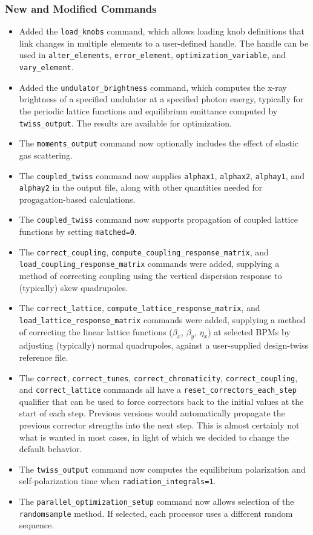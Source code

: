 \documentclass[11pt]{article}
\begin{document}
\subsubsection{New and Modified Commands}
\begin{itemize}
\item Added the \verb|load_knobs| command, which allows loading knob definitions that link changes in multiple elements to
  a user-defined handle. The handle can be used in \verb|alter_elements|, \verb|error_element|, \verb|optimization_variable|,
  and \verb|vary_element|.
\item Added the \verb|undulator_brightness| command, which computes the x-ray brightness of a specified undulator at a specified
  photon energy, typically for the periodic lattice functions and equilibrium emittance computed by \verb|twiss_output|.
  The results are available for optimization.
\item The \verb|moments_output| command now optionally includes the effect of elastic gas scattering.
\item The \verb|coupled_twiss| command now supplies \verb|alphax1|, \verb|alphax2|, \verb|alphay1|, and \verb|alphay2| in
  the output file, along with other quantities needed for progagation-based calculations.
\item The \verb|coupled_twiss| command now supports propagation of coupled lattice functions by setting \verb|matched=0|.
\item The \verb|correct_coupling|, \verb|compute_coupling_response_matrix|, and \verb|load_coupling_response_matrix| commands
  were added, supplying a method of correcting coupling using the vertical dispersion response to (typically) skew quadrupoles.
\item The \verb|correct_lattice|, \verb|compute_lattice_response_matrix|, and \verb|load_lattice_response_matrix| commands
  were added, supplying a method of correcting the linear lattice functions ($\beta_x$, $\beta_y$, $\eta_x$) at
  selected BPMs by adjusting (typically) normal quadrupoles, against a user-supplied design-twiss reference file.
\item The \verb|correct|, \verb|correct_tunes|, \verb|correct_chromaticity|, \verb|correct_coupling|, and \verb|correct_lattice|
  commands all have a \verb|reset_correctors_each_step| qualifier that can be used to force correctors back to the initial
  values at the start of each step. Previous versions would automatically propagate the previous corrector strengths into the
  next step. This is almost certainly not what is wanted in most cases, in light of which we decided to change the default behavior.
\item The \verb|twiss_output| command now computes the equilibrium polarization and self-polarization time when
  \verb|radiation_integrals=1|.
\item The \verb|parallel_optimization_setup| command now allows selection of the \verb|randomsample| method. If selected, each processor
  uses a different random sequence.
\end{itemize}
\end{document}
